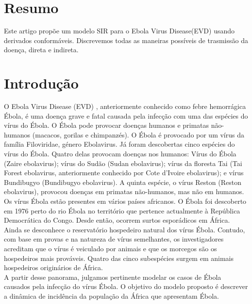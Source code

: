 \documentclass[12pt,a4paper]{article}
\begin{document}
 

\thispagestyle{primeira}



\section*{Resumo}
Este artigo propõe um modelo SIR para o Ebola Virus Disease(EVD) usando derivados conformáveis. Discrevemos todas as maneiras possíveis de trasmissão da doença, direta e indireta. 
\section*{Introdução}
O Ebola Virus Disease (EVD) , anteriormente conhecido como febre hemorrágica Ébola, é uma doença grave e fatal causada pela infecção com uma das espécies do vírus do Ébola. O Ébola pode provocar doenças humanos e primatas não-humanos (macacos, gorilas e chimpanzés).
O Ébola é provocado por um vírus da família Filoviridae, género
Ebolavirus. Já foram descobertas cinco espécies do vírus do Ébola.
Quatro delas provocam doenças nos humanos: Vírus do Ébola (Zaire
ebolavirus); vírus do Sudão (Sudan ebolavirus); vírus da floresta
Tai (Tai Forest ebolavirus, anteriormente conhecido por Cote
d'Ivoire ebolavirus); e vírus Bundibugyo (Bundibugyo ebolavirus).
A quinta espécie, o vírus Reston (Reston ebolavirus), provocou
doenças em primatas não-humanos, mas não em humanos.
Os vírus Ébola estão presentes em vários países africanos. O Ébola
foi descoberto em 1976 perto do rio Ébola no território que
pertence actualmente à República Democrática do Congo. Desde
então, ocorrem surtos esporádicos em África. Ainda se desconhece o reservatório hospedeiro natural dos vírus Ébola. Contudo, com base em provas e na natureza de vírus semelhantes,
os investigadores acreditam que o vírus é veiculado por animais e que os morcegos são os hospedeiros mais prováveis. Quatro das cinco
subespécies surgem em animais hospedeiros originários de África. \\
A partir desse panorama, julgamos pertinente modelar os casos de Ébola causados pela infecção do vírus Ébola. O objetivo do modelo proposto é descrever a dinâmica de incidência da população da África que apresentam Ébola. 


\newpage
\pagestyle{normal}
\end{document}
